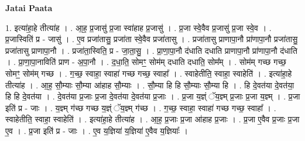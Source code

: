 \documentclass[17pt]{extarticle}
\begin{document}
\textbf{Jatai Paata} \newline

1. इत्या॑हा॒हे तीत्या॑ह । . आ॒ह॒ प्र॒जासु॑ प्र॒जा स्वा॑हाह प्र॒जासु॑ । . प्र॒जा स्वे॒वैव प्र॒जासु॑ प्र॒जा स्वे॒व । . प्र॒जास्विति॑ प्र - जासु॑ । . ए॒व प्रजा॑तासु॒ प्रजा॑ता स्वे॒वैव प्रजा॑तासु । . प्रजा॑तासु प्राणापा॒नौ प्रा॑णापा॒नौ प्रजा॑तासु॒ प्रजा॑तासु प्राणापा॒नौ । . प्रजा॑ता॒स्विति॒ प्र - जा॒ता॒सु॒ । . प्रा॒णा॒पा॒नौ द॑धाति दधाति प्राणापा॒नौ प्रा॑णापा॒नौ द॑धाति । . प्रा॒णा॒पा॒नाविति॑ प्राण - अ॒पा॒नौ । . द॒धा॒ति॒ सोमꣳ॒॒ सोम॑म् दधाति दधाति॒ सोम᳚म् । . सोम॑म् गच्छ गच्छ॒ सोमꣳ॒॒ सोम॑म् गच्छ । . ग॒च्छ॒ स्वाहा॒ स्वाहा॑ गच्छ गच्छ॒ स्वाहा᳚ । . स्वाहेतीति॒ स्वाहा॒ स्वाहेति॑ । . इत्या॑हा॒हे तीत्या॑ह । . आ॒ह॒ सौ॒म्याः सौ॒म्या आ॑हाह सौ॒म्याः । . सौ॒म्या हि हि सौ॒म्याः सौ॒म्या हि । . हि दे॒वत॑या दे॒वत॑या॒ हि हि दे॒वत॑या । . दे॒वत॑या प्र॒जाः प्र॒जा दे॒वत॑या दे॒वत॑या प्र॒जाः । . प्र॒जा य॒ज्ञ्ं ॅय॒ज्ञ्म् प्र॒जाः प्र॒जा य॒ज्ञ्म् । . प्र॒जा इति॑ प्र - जाः । . य॒ज्ञ्म् ग॑च्छ गच्छ य॒ज्ञ्ं ॅय॒ज्ञ्म् ग॑च्छ । . ग॒च्छ॒ स्वाहा॒ स्वाहा॑ गच्छ गच्छ॒ स्वाहा᳚ । . स्वाहेतीति॒ स्वाहा॒ स्वाहेति॑ । . इत्या॑हा॒हे तीत्या॑ह । . आ॒ह॒ प्र॒जाः प्र॒जा आ॑हाह प्र॒जाः । . प्र॒जा ए॒वैव प्र॒जाः प्र॒जा ए॒व । . प्र॒जा इति॑ प्र - जाः । . ए॒व य॒ज्ञिया॑ य॒ज्ञिया॑ ए॒वैव य॒ज्ञियाः᳚ । \newline
\end{document}
